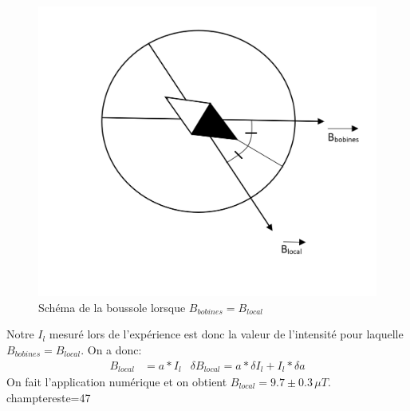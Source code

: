 \documentclass[12pt]{article}
\begin{document}
\begin{figure}[!h]
	\begin{center}
		\includegraphics[scale=0.5]{img/Boussole.png}
	\end{center}
	\label{SchmBouss}
	\caption{Schéma de la boussole lorsque $B_{bobines}=B_{local}$}
\end{figure}

Notre $I_l$ mesuré lors de l'expérience est donc la valeur de l'intensité pour laquelle $B_{bobines}=B_{local}$. On a donc:
\begin{align*}
B_{local}&=a*I_l & \delta B_{local}=a*\delta I_l + I_l * \delta a
\end{align*}
On fait l'application numérique et on obtient $B_{local}=9.7\pm 0.3\, \mu T$. 
champtereste=47
\end{document}
